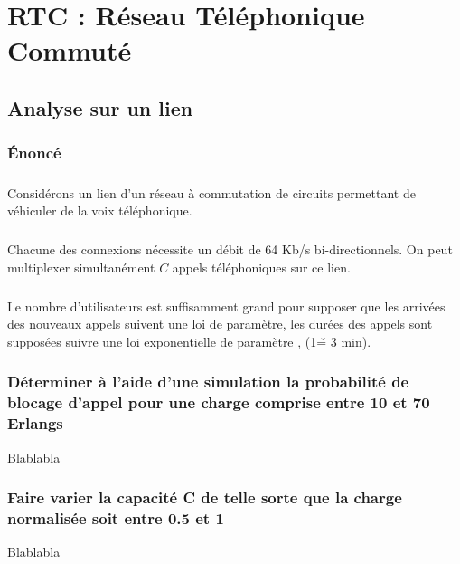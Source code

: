 %
\chapter{RTC : Réseau Téléphonique Commuté}
%
    \section{Analyse sur un lien}
        \label{seullien} %
%
        \subsection{Énoncé}
%
            \paragraph{}
Considérons un lien d'un réseau à commutation de circuits permettant de véhiculer de la voix téléphonique.
%
            \paragraph{}
Chacune des connexions nécessite un débit de 64 Kb/s bi-directionnels.
On peut multiplexer simultanément $C$ appels téléphoniques sur ce lien.
%
        \paragraph{}
        Le nombre d'utilisateurs est suffisamment grand pour supposer que les arrivées des nouveaux appels suivent une loi de paramètre, les durées des appels sont supposées suivre une loi exponentielle de paramètre , (1\u = 3 min).
%
        \subsection{Déterminer à l'aide d'une simulation la probabilité de blocage d'appel pour une charge comprise entre 10 et 70 Erlangs}
Blablabla
%
        \subsection{Faire varier la capacité C de telle sorte que la charge normalisée soit entre 0.5 et 1}
Blablabla
%
